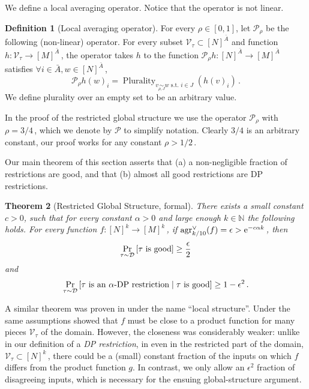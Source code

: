 \documentclass[11pt]{article}
\numberwithin{equation}{section}
\newtheorem{theorem}{Theorem}[section]
\theoremstyle{definition}
\newtheorem{definition}[theorem]{Definition}
\theoremstyle{plain}
\newcommand{\eee}{\mathrm e}
\newcommand{\Prob}[2][]{\Pr_{{#1}}\left[#2\right]} %
\newcommand\f{f} %
\newcommand{\g}{g} %
\newcommand\h{h} %
\newcommand{\test}[2]{
	\ifx &#2&
	\textrm{agr}^{#1}
	\else	
	\textrm{agr}^{#1}_{#2}
	\fi}
\newcommand\cons{\mathcal{V}} %
\newcommand\cor[1]{\underset{\scriptscriptstyle#1}{\sim}} %
\DeclareMathOperator*\plur{\mathrm{Plurality}} %
\newcommand\rest[1]{{\bar{#1}}}  %
\begin{document}
We define a local averaging operator.
Notice that the operator is not linear.
\begin{definition}[Local averaging operator] \label{def:local average}
	For every $\rho\in[0,1]$, let $\mathcal{P}_\rho$ be the following (non-linear) operator. For every subset $\cons_\tau\subset[N]^\rest{A}$ and function $\h:\cons_\tau\rightarrow[M]^{\bar{A}}$\,, the operator takes $h$ to the function $\mathcal{P}_\rho h:[N]^{\bar{A}}\rightarrow[M]^{\bar{A}}$ satisfies $ \forall i\in\bar{A},w\in[N]^{\bar{A}}$\,,
	\[  \mathcal{P}_\rho \h(w)_i = \plur_{v\cor{\rho,J}{w}\text{ s.t. } i\in J}(\h(v)_i)\,.\] %
	We define plurality over an empty set to be an arbitrary value.
\end{definition}
In the proof of the restricted global structure we use the operator $\mathcal{P}_\rho$ with $\rho = 
%
3/4$\,, %
which we denote by $\mathcal{P}$ to simplify notation. Clearly 
%
$3/4$ %
 is an arbitrary constant, our proof works for any constant $\rho>
%
1/2$\,. %

Our main theorem of this section asserts that (a) a non-negligible fraction of restrictions are good, and that (b) almost all good restrictions are DP restrictions.
\begin{theorem}[Restricted Global Structure, formal]\label{thm:local} 
	There exists a small constant $c>0$, such that 
	for every constant $\alpha>0$ and large enough $k\in\mathbb{N}$ the following holds.
	For every function  $\f:[N]^k\rightarrow[M]^k$\,, if $\test{\vee}{k/10}(\f)=\epsilon > \eee^{-c\alpha k}$\,, then 
	\[ \Prob[\tau\sim\mathcal{D}]{\tau \hbox{ is good}} \ge \frac{\epsilon}{2}
	\] and \[ \Prob[\tau\sim\mathcal{D}]{\tau \hbox{ is an $\alpha$-DP restriction} \;|\; \tau\hbox{ is good}} \ge 1-{\epsilon}^{2}\,.\] %
\end{theorem}


A similar theorem was proven in \cite{dinur2014direct} under the name ``local structure''. Under the same assumptions \cite{dinur2014direct} showed that $f$ must be close to a product function for many pieces $\cons_\tau$ of the domain. However, the closeness was considerably weaker: unlike in our definition of a \emph{DP restriction}, in \cite{dinur2014direct} even in the restricted part of the domain, $\cons_\tau\subset [N]^k$\,, there could be a (small) constant fraction of the inputs on which $f$ differs from the product function $\g$. In contrast, we only allow an $\epsilon^2$ fraction of disagreeing inputs, which is necessary for the ensuing global-structure argument.
\end{document}

